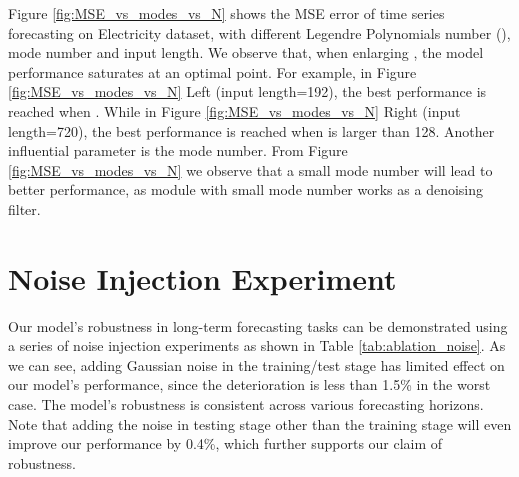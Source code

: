 \documentclass{article}
\begin{document}
Figure \ref{fig:MSE_vs_modes_vs_N} shows the MSE error of time series forecasting on Electricity dataset, with different Legendre Polynomials number (), mode number and input length. We observe that, when enlarging , the model performance saturates at an optimal point. For example, in Figure \ref{fig:MSE_vs_modes_vs_N} Left (input length=192), the best performance is reached when . While in Figure \ref{fig:MSE_vs_modes_vs_N} Right (input length=720), the best performance is reached when  is larger than 128. Another influential parameter is the mode number. From Figure \ref{fig:MSE_vs_modes_vs_N} we observe that a small mode number will lead to better performance, as module with small mode number works as a denoising filter. \section{Noise Injection Experiment}
\label{app:noise}
Our model's robustness in long-term forecasting tasks can be demonstrated using a series of noise injection experiments as shown in Table \ref{tab:ablation_noise}. As we can see, adding Gaussian noise in the training/test stage has limited effect on our model's performance, since the deterioration is less than 1.5\% in the worst case. The model's robustness is consistent across various forecasting horizons. Note that adding the noise in testing stage other than the training stage will even improve our performance by 0.4\%, which further supports our claim of robustness. 
\end{document}
